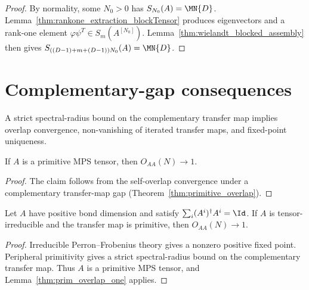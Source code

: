 \begin{proof}
    \leanok
    By normality, some $N_0>0$ has $S_{N_0}(A)=\MN{D}$.
    Lemma~\ref{thm:rankone_extraction_blockTensor} produces eigenvectors
    and a rank-one element
    $\varphi\psi^T\in S_m(A^{[N_0]})$.
    Lemma~\ref{thm:wielandt_blocked_assembly} then gives
    $S_{((D-1)+m+(D-1))N_0}(A)=\MN{D}$.
\end{proof}

\section{Complementary-gap consequences}
\label{sec:app_wielandt_complementary_gap}

A strict spectral-radius bound on the complementary transfer map implies
overlap convergence, non-vanishing of iterated transfer maps, and fixed-point
uniqueness.

\begin{lemma}\label{thm:prim_overlap_one}
    \leanok
    If $A$ is a primitive MPS tensor, then $O_{AA}(N)\to1$.
\end{lemma}

\begin{proof}\leanok{}
    The claim follows from the self-overlap convergence under a
    complementary transfer-map gap
    (Theorem~\ref{thm:primitive_overlap}).
\end{proof}

\begin{lemma}
    \label{thm:peripheral_primitive_irreducible_overlap_one}
    \leanok
    Let $A$ have positive bond dimension and satisfy
    $\sum_i(A^i)^\dagger A^i=\Id$.
    If $A$ is tensor-irreducible and the transfer map is primitive, then
    $O_{AA}(N)\to1$.
\end{lemma}

\begin{proof}\leanok{}
    Irreducible Perron--Frobenius theory gives a nonzero positive fixed
    point. Peripheral primitivity gives a strict spectral-radius bound on the
    complementary transfer map. Thus $A$ is a primitive MPS tensor, and
    Lemma~\ref{thm:prim_overlap_one} applies.
\end{proof}

